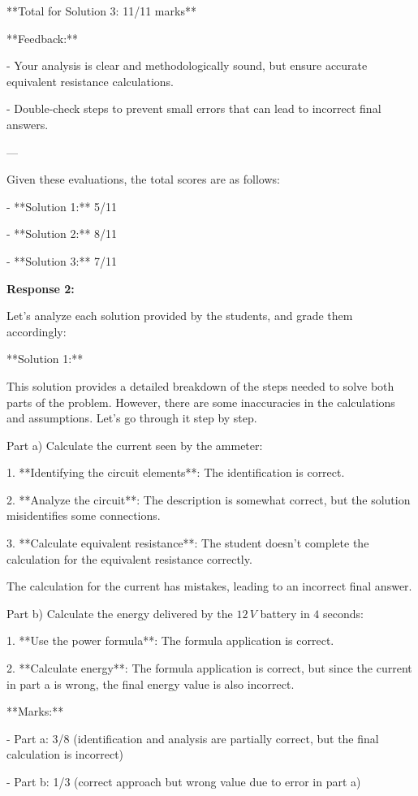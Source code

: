 \documentclass[a4paper,11pt]{article}
\begin{document}
**Total for Solution 3: 11/11 marks**

**Feedback:**

- Your analysis is clear and methodologically sound, but ensure accurate equivalent resistance calculations.

- Double-check steps to prevent small errors that can lead to incorrect final answers.

---

Given these evaluations, the total scores are as follows:

- **Solution 1:** 5/11

- **Solution 2:** 8/11

- **Solution 3:** 7/11

\bigskip 
\textbf{Response 2:}

Let's analyze each solution provided by the students, and grade them accordingly:

**Solution 1:**

This solution provides a detailed breakdown of the steps needed to solve both parts of the problem. However, there are some inaccuracies in the calculations and assumptions. Let's go through it step by step.

Part a) Calculate the current seen by the ammeter:

1. **Identifying the circuit elements**: The identification is correct.

2. **Analyze the circuit**: The description is somewhat correct, but the solution misidentifies some connections.

3. **Calculate equivalent resistance**: The student doesn't complete the calculation for the equivalent resistance correctly.

The calculation for the current has mistakes, leading to an incorrect final answer.

Part b) Calculate the energy delivered by the \(12\,V\) battery in \(4\) seconds:

1. **Use the power formula**: The formula application is correct.

2. **Calculate energy**: The formula application is correct, but since the current in part a is wrong, the final energy value is also incorrect.

**Marks:**

- Part a: 3/8 (identification and analysis are partially correct, but the final calculation is incorrect)

- Part b: 1/3 (correct approach but wrong value due to error in part a)
\end{document}
